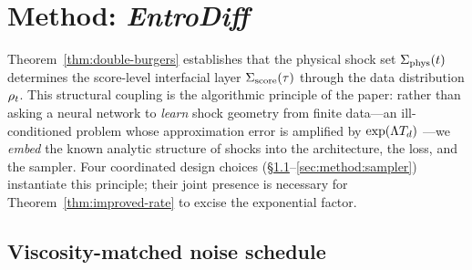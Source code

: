 %
%
\section{Method: \emph{EntroDiff}}
\label{sec:method}

Theorem~\ref{thm:double-burgers} establishes that the physical shock set $\Sigma_{\mathrm{phys}}(t)$ determines the score-level interfacial layer $\Sigma_{\mathrm{score}}(\tau)$ through the data distribution $\rho_{t}$. This structural coupling is the algorithmic principle of the paper: rather than asking a neural network to \emph{learn} shock geometry from finite data---an ill-conditioned problem whose approximation error is amplified by $\exp(\Lambda T_{d})$ \citep{sarkar2026scoreshocks}---we \emph{embed} the known analytic structure of shocks into the architecture, the loss, and the sampler. Four coordinated design choices (§\ref{sec:method:schedule}--\ref{sec:method:sampler}) instantiate this principle; their joint presence is necessary for Theorem~\ref{thm:improved-rate} to excise the exponential factor.

\subsection{Viscosity-matched noise schedule}
\label{sec:method:schedule}

